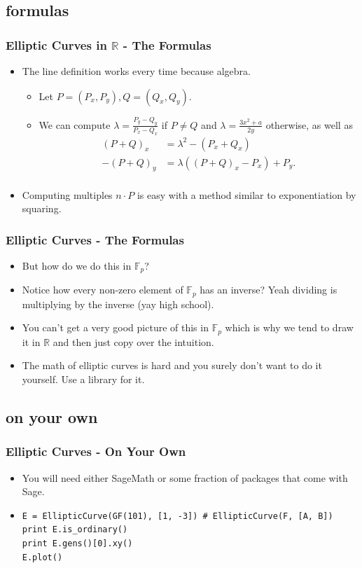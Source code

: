 \documentclass[aspectratio=169,t]{beamer}
\newcommand{\RR}{\mathbb{R}}
\newcommand{\FF}{\mathbb{F}}
\begin{document}
\subsection{formulas}
\begin{frame}
\frametitle{Elliptic Curves in $\mathbb{R}$ - The Formulas}
\begin{itemize}
\item
The line definition works every time because algebra. \pause
\begin{itemize}
\item
Let $P = (P_x, P_y), Q = (Q_x, Q_y)$.
\item
We can compute $\lambda = \frac{P_y - Q_y}{P_x - Q_x}$ if $P \neq Q$ and
$\lambda = \frac{3x^2 + a}{2y}$ otherwise, as well as
\[ \begin{aligned}
(P + Q)_x &= \lambda^2 - (P_x + Q_x) \\
-(P + Q)_y &= \lambda ((P + Q)_x - P_x) + P_y. \\
\end{aligned} \]
\end{itemize}
\item
Computing multiples $n \cdot P$ is easy with a method similar to exponentiation
by squaring.
\end{itemize}
\end{frame}

\begin{frame}
\frametitle{Elliptic Curves - The Formulas}
\begin{itemize}
\item
But how do we do this in $\FF_p$? \pause
\item
Notice how every non-zero element of $\FF_p$ has an inverse? Yeah dividing is
multiplying by the inverse (yay high school).
\item
You can't get a very good picture of this in $\FF_p$ which is why we tend to
draw it in $\RR$ and then just copy over the intuition.
\item
The math of elliptic curves is hard and you surely don't want to do it yourself.
Use a library for it.
\end{itemize}
\end{frame}

\subsection{on your own}
\begin{frame}[fragile]
\frametitle{Elliptic Curves - On Your Own}
\begin{itemize}
\item
You will need either SageMath or some fraction of packages that come with Sage.
\item
\begin{lstlisting}
E = EllipticCurve(GF(101), [1, -3]) # EllipticCurve(F, [A, B])
print E.is_ordinary()
print E.gens()[0].xy()
E.plot()
\end{lstlisting}
\end{itemize}
\end{frame}
\end{document}
